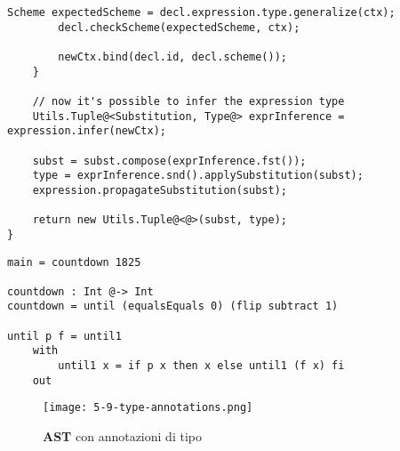 \begin{lstlisting}[caption={Metodo di inferenza per espressioni \texttt{let}}, style=javaCode, label={lst:5-9-let-inference-java}]
        Scheme expectedScheme = decl.expression.type.generalize(ctx);
        decl.checkScheme(expectedScheme, ctx);

        newCtx.bind(decl.id, decl.scheme());
    }

    // now it's possible to infer the expression type
    Utils.Tuple@<Substitution, Type@> exprInference = expression.infer(newCtx);

    subst = subst.compose(exprInference.fst());
    type = exprInference.snd().applySubstitution(subst);
    expression.propagateSubstitution(subst);

    return new Utils.Tuple@<@>(subst, type);
}
\end{lstlisting}

\newpage

\begin{lstlisting}[caption={Esempio di inferenza}, style=funxCode, label={lst:5-9-types-funx}]
main = countdown 1825

countdown : Int @-> Int
countdown = until (equalsEquals 0) (flip subtract 1) 

until p f = until1
    with
        until1 x = if p x then x else until1 (f x) fi
    out    
\end{lstlisting}

\begin{figure}
    \vspace{4mm}
    \texttt{[image: 5-9-type-annotations.png]}
    \caption{\textbf{AST} con annotazioni di tipo}
    \label{fig:5-9-type-annotations}
\end{figure}
